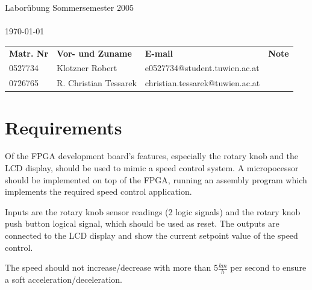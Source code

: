 \documentclass[a4paper,10pt]{scrartcl}
\begin{document}
\begin{titlepage}
\begin{center}
\begin{Large}

\sffamily \vspace*{\fill}{Institut f\"ur Computertechnik\\
Labor integrierte Schaltungen\\
384.088\\}
\vfill { Labor\"ubung Sommersemester 2005\\}
\vspace{10mm}{Betreuer: Dipl.-Ing. Herr Nachtnebel}\\
\today\\
\end{Large}
\vfill

\begin{tabular}{llll}
\textbf{Matr. Nr} & \textbf{Vor- und Zuname} & \textbf{E-mail} & \textbf{Note} \\
0527734 & Klotzner Robert & e0527734@student.tuwien.ac.at &  \\
0726765 & R. Christian Tessarek & christian.tessarek@tuwien.ac.at &
\end{tabular}

\end{center}
\end{titlepage}



\pagebreak
\tableofcontents
\pagebreak


\section{Requirements}
\label{sec:aufgabe}

Of the FPGA development board's features, especially the rotary knob and the LCD display, should be used to mimic a speed control system. 
A micropocessor should be implemented on top of the FPGA, running an assembly program which implements the required speed control application. 

Inputs are the rotary knob sensor readings (2 logic signals) and the rotary knob push button logical signal, which should be used as reset. 
The outputs are connected to the LCD display and show the current setpoint value of the speed control. 

The speed should not increase/decrease with more than $5 \frac{km}{h}$ per second to ensure a soft acceleration/deceleration. 
\end{document}
